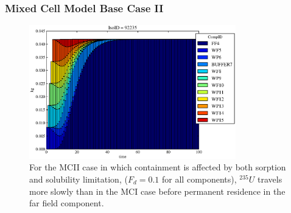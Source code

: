 \begin{frame}[ctb!]
  \frametitle{Mixed Cell Model Base Case II}
\begin{figure}[ht]
\centering
\includegraphics[width=0.8\textwidth]{./images/mcIII.eps}
\caption[$^{235}U$ residence. Mixed Cell Coupled Sorption and Solubility Limitation.]{
For the MCII case in which containment is affected by both sorption and 
solubility limitation,
($F_{d}=0.1$ for all components), $^{235}U$ travels more slowly than in the MCI case 
before permanent residence in the far field component.
}
\label{fig:mcIIIall}
\end{figure}
\end{frame}


